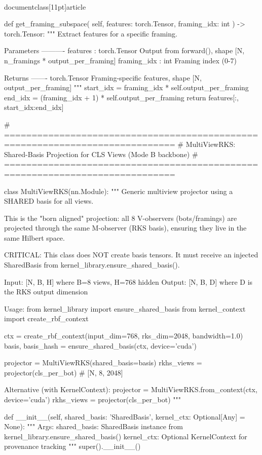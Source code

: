 \\documentclass[11pt]{article}
\begin{document}
\begin{CodeBlock}
    def get_framing_subspace(
        self,
        features: torch.Tensor,
        framing_idx: int
    ) -> torch.Tensor:
        """
        Extract features for a specific framing.
        
        Parameters
        ----------
        features : torch.Tensor
            Output from forward(), shape [N, n_framings * output_per_framing]
        framing_idx : int
            Framing index (0-7)
        
        Returns
        -------
        torch.Tensor
            Framing-specific features, shape [N, output_per_framing]
        """
        start_idx = framing_idx * self.output_per_framing
        end_idx = (framing_idx + 1) * self.output_per_framing
        return features[:, start_idx:end_idx]


# =============================================================================
# MultiViewRKS: Shared-Basis Projection for CLS Views (Mode B backbone)
# =============================================================================

class MultiViewRKS(nn.Module):
    """
    Generic multiview projector using a SHARED basis for all views.
    
    This is the "born aligned" projection: all 8 V-observers (bots/framings)
    are projected through the same M-observer (RKS basis), ensuring they
    live in the same Hilbert space.
    
    CRITICAL: This class does NOT create basis tensors. It must receive
    an injected SharedBasis from kernel_library.ensure_shared_basis().
    
    Input: [N, B, H] where B=8 views, H=768 hidden
    Output: [N, B, D] where D is the RKS output dimension
    
    Usage:
        from kernel_library import ensure_shared_basis
        from kernel_context import create_rbf_context
        
        ctx = create_rbf_context(input_dim=768, rks_dim=2048, bandwidth=1.0)
        basis, basis_hash = ensure_shared_basis(ctx, device='cuda')
        
        projector = MultiViewRKS(shared_basis=basis)
        rkhs_views = projector(cls_per_bot)  # [N, 8, 2048]
        
    Alternative (with KernelContext):
        projector = MultiViewRKS.from_context(ctx, device='cuda')
        rkhs_views = projector(cls_per_bot)
    """
    
    def __init__(self, shared_basis: 'SharedBasis', kernel_ctx: Optional[Any] = None):
        """
        Args:
            shared_basis: SharedBasis instance from kernel_library.ensure_shared_basis()
            kernel_ctx: Optional KernelContext for provenance tracking
        """
        super().__init__()
        

\end{CodeBlock}
\end{document}
